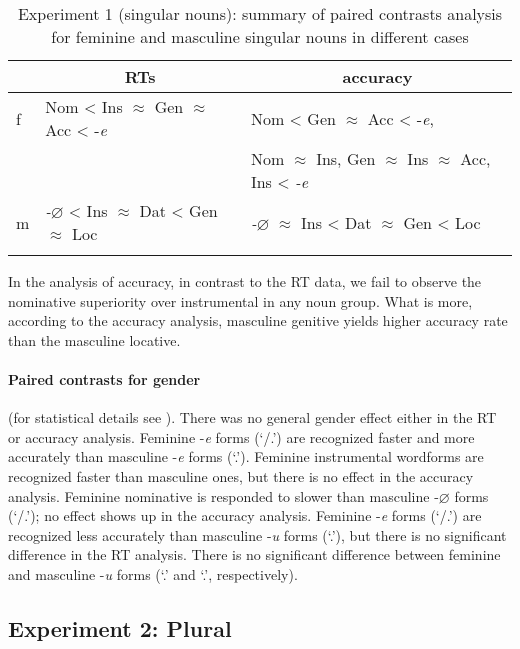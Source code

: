\documentclass[output=paper, modfonts,newtxmath,hidelinks]{langscibook}
\begin{document}
\begin{table}
	\caption{Experiment 1 (singular nouns): summary of paired contrasts analysis for feminine and masculine singular nouns in different cases}
    \label{tab:caseSgHierarchy}
    \begin{tabular}{*{3}l}
    \lsptoprule
    ~	&	\multicolumn{1}{c}{RTs}	&	\multicolumn{1}{c}{accuracy}\\
    \midrule
    f	&	Nom < Ins $\approx$ Gen $\approx$ Acc < -\textit{e}	&	Nom < Gen $\approx$ Acc < -\textit{e}, \\
    ~	&	~	&	Nom $\approx$ Ins, Gen $\approx$ Ins $\approx$ Acc, Ins < \textit{-e}\\
    m	&	\textit{-$\varnothing$} < Ins $\approx$ Dat < Gen $\approx$ Loc	&	\textit{-$\varnothing$} $\approx$ Ins < Dat $\approx$ Gen  < Loc			\\
    \lspbottomrule
    \end{tabular}
\end{table}

In the analysis of accuracy, in contrast to the RT data, we fail to observe the nominative superiority over instrumental in any noun group. What is more, according to the accuracy analysis, masculine genitive yields higher accuracy rate than the masculine locative. 

\paragraph*{Paired contrasts for gender} (for statistical details see ). There was no general gender effect either in the RT or accuracy analysis. Feminine -\textit{e} forms (`\datt/\locc.\fem') are recognized faster and more accurately than masculine -\textit{e} forms (`\locc.\masc'). Feminine instrumental wordforms are recognized faster than masculine ones, but there is no effect in the accuracy analysis. Feminine nominative is responded to slower than masculine -$\varnothing$ forms (`\nomm/\accc.\masc'); no effect shows up in the accuracy analysis. Feminine -\textit{e} forms (`\datt/\locc.\fem') are recognized less accurately than masculine -\textit{u}  forms (`\datt.\masc'), but there is no significant difference in the RT analysis. There is no significant difference between feminine and masculine -\textit{u} forms (`\accc.\fem' and `\datt.\masc', respectively).

\subsection{Experiment 2: Plural}
\end{document}

